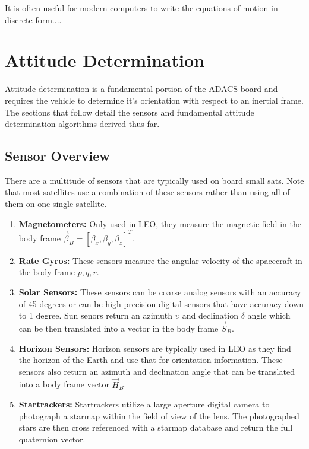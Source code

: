 \documentclass{article}
\begin{document}
It is often useful for modern computers to write the equations of
motion in discrete form....

\section{Attitude Determination}

Attitude determination is a fundamental portion of the ADACS board and
requires the vehicle to determine it's orientation with respect to an
inertial frame. The sections that follow detail the sensors and
fundamental attitude determination algorithms derived thus far. 

\subsection{Sensor Overview}

There are a multitude of sensors that are typically used on board
small sats. Note that most satellites use a combination of these
sensors rather than using all of them on one single satellite.

\begin{enumerate}[itemsep=-5pt]
  \item {\bf Magnetometers:} Only used in LEO, they measure the
    magnetic field in the body frame $\vec{\beta}_B = [\beta_x,\beta_y,\beta_z]^T$.
    \item {\bf Rate Gyros:} These sensors measure the angular velocity
      of the spacecraft in the body frame $p,q,r$.
    \item {\bf Solar Sensors:} These sensors can be coarse analog
      sensors with an accuracy of 45 degrees or can be high precision
      digital sensors that have accuracy down to 1 degree. Sun senors
      return an azimuth $\upsilon$ and declination $\delta$ angle which can be then
      translated into a vector in the body frame $\vec{S}_B$.
    \item {\bf Horizon Sensors:} Horizon sensors are typically used in
      LEO as they find the horizon of the Earth and use that for
      orientation information. These sensors also return an azimuth
      and declination angle that can be translated into a body frame
      vector $\vec{H}_B$.
      \item {\bf Startrackers:} Startrackers utilize a large aperture
        digital camera to photograph a starmap within the field of
        view of the lens. The photographed stars are then cross
        referenced with a starmap database and return the full
        quaternion vector.
\end{enumerate}
\end{document}
